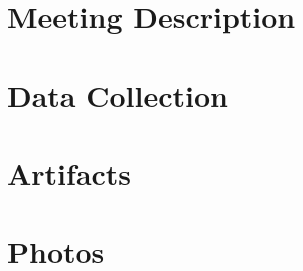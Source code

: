 \documentclass[12pt]{article} %
\begin{document}
\section{Meeting Description}

\section{Data Collection}

\section{Artifacts}

\clearpage
\section{Photos}
\end{document}
